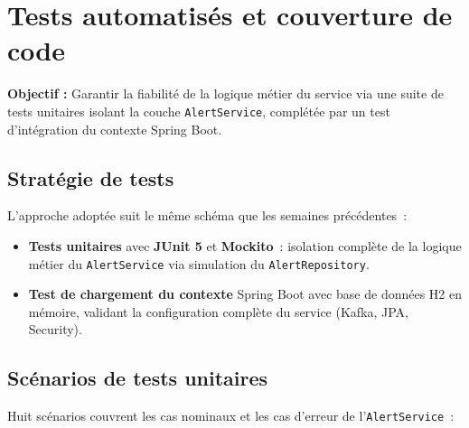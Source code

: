 \documentclass[12pt,a4paper]{article}
\begin{document}
\newpage
\section{Tests automatisés et couverture de code}

\begin{infobox}
\textbf{Objectif :} Garantir la fiabilité de la logique métier du service via une
suite de tests unitaires isolant la couche \texttt{AlertService}, complétée par un
test d'intégration du contexte Spring Boot.
\end{infobox}

\vspace{0.5cm}

\subsection{Stratégie de tests}

L'approche adoptée suit le même schéma que les semaines précédentes~:

\begin{itemize}
  \item \textbf{Tests unitaires} avec \textbf{JUnit 5} et \textbf{Mockito}~:
        isolation complète de la logique métier du \texttt{AlertService} via
        simulation du \texttt{AlertRepository}.
  \item \textbf{Test de chargement du contexte} Spring Boot avec base de données
        H2 en mémoire, validant la configuration complète du service (Kafka,
        JPA, Security).
\end{itemize}

\subsection{Scénarios de tests unitaires}

Huit scénarios couvrent les cas nominaux et les cas d'erreur de l'\texttt{AlertService}~:
\end{document}
